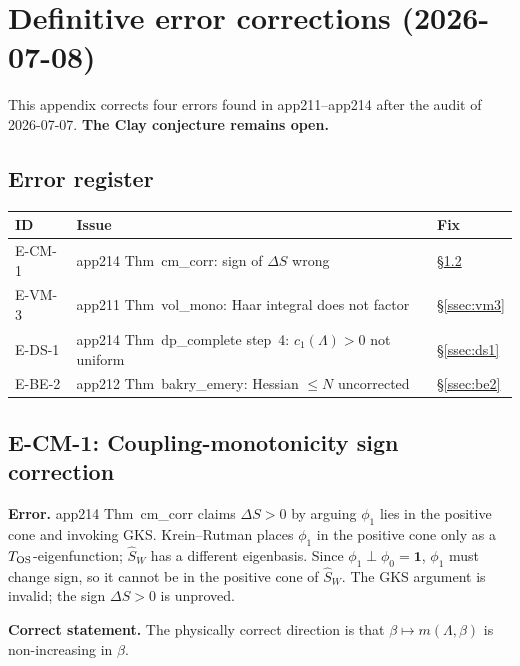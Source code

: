 \section{Definitive error corrections (2026-07-08)}
\label{app:definitive_corrections}

This appendix corrects four errors found in app211--app214 after the audit of 2026-07-07.
\textbf{The Clay conjecture remains open.}

\subsection{Error register}

\begin{center}
\renewcommand{\arraystretch}{1.15}
\begin{tabular}{l|p{6cm}|l}
\hline
\textbf{ID} & \textbf{Issue} & \textbf{Fix}\\
\hline
E-CM-1 & app214 Thm~cm\_corr: sign of $\Delta S$ wrong & \S\ref{ssec:cm1}\\
E-VM-3 & app211 Thm~vol\_mono: Haar integral does not factor & \S\ref{ssec:vm3}\\
E-DS-1 & app214 Thm~dp\_complete step~4: $c_1(\Lambda)>0$ not uniform & \S\ref{ssec:ds1}\\
E-BE-2 & app212 Thm~bakry\_emery: Hessian $\le N$ uncorrected & \S\ref{ssec:be2}\\
\hline
\end{tabular}
\end{center}

\subsection{E-CM-1: Coupling-monotonicity sign correction}
\label{ssec:cm1}

\textbf{Error.} app214 Thm~cm\_corr claims $\Delta S>0$ by arguing $\phi_1$
lies in the positive cone and invoking GKS.
Krein--Rutman places $\phi_1$ in the positive cone only as a $T_{\rm OS}$-eigenfunction;
$\hat{S}_W$ has a different eigenbasis.
Since $\phi_1\perp\phi_0=\mathbf{1}$, $\phi_1$ must change sign,
so it cannot be in the positive cone of $\hat{S}_W$.
The GKS argument is invalid; the sign $\Delta S>0$ is unproved.

\textbf{Correct statement.} The physically correct direction is that
$\beta\mapsto m(\Lambda,\beta)$ is non-increasing in $\beta$.

